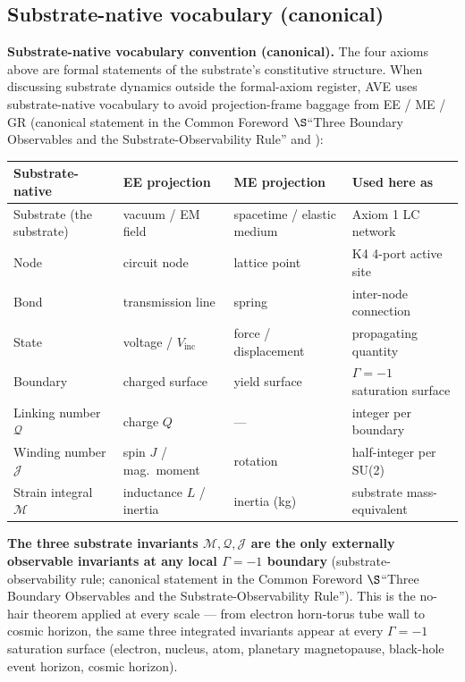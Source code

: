 \subsection*{Substrate-native vocabulary (canonical)}
\label{sec:substrate_vocab_box_ch1}

\textbf{Substrate-native vocabulary convention (canonical).}
The four axioms above are formal statements of the substrate's constitutive
structure. When discussing substrate dynamics outside the formal-axiom
register, AVE uses substrate-native vocabulary to avoid projection-frame
baggage from EE / ME / GR (canonical statement in the Common Foreword
$\S$``Three Boundary Observables and the Substrate-Observability Rule''
and ):

\begin{center}\small
\begin{tabular}{|p{3.2cm}|p{3.0cm}|p{3.0cm}|p{2.8cm}|}
\hline
\textbf{Substrate-native} & \textbf{EE projection} & \textbf{ME projection} & \textbf{Used here as} \\
\hline
Substrate (the substrate) & vacuum / EM field & spacetime / elastic medium & Axiom 1 LC network \\
\hline
Node & circuit node & lattice point & K4 4-port active site \\
\hline
Bond & transmission line & spring & inter-node connection \\
\hline
State & voltage / $V_{\text{inc}}$ & force / displacement & propagating quantity \\
\hline
Boundary & charged surface & yield surface & $\Gamma = -1$\gammaundeclared{} saturation surface \\
\hline
Linking number $\mathcal{Q}$ & charge $Q$ & --- & integer per boundary \\
\hline
Winding number $\mathcal{J}$ & spin $J$ / mag.~moment & rotation & half-integer per SU(2) \\
\hline
Strain integral $\mathcal{M}$ & inductance $L$ / inertia & inertia (kg) & substrate mass-equivalent \\
\hline
\end{tabular}
\end{center}

\textbf{The three substrate invariants $\mathcal{M}, \mathcal{Q}, \mathcal{J}$
are the only externally observable invariants at any local $\Gamma = -1$\gammaundeclared{}
boundary} (substrate-observability rule; canonical statement in the Common
Foreword $\S$``Three Boundary Observables and the Substrate-Observability
Rule''). This is the no-hair theorem applied at every scale --- from electron
horn-torus tube wall to cosmic horizon, the same three integrated invariants
appear at every $\Gamma = -1$\gammaundeclared{} saturation surface (electron, nucleus, atom,
planetary magnetopause, black-hole event horizon, cosmic horizon).

